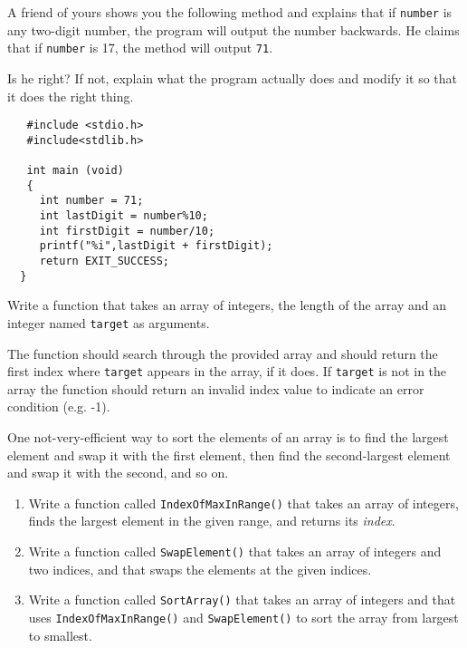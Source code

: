 
\begin{exercise}

A friend of yours shows you the following method and
explains that if {\tt number} is any two-digit number, the program
will output the number backwards.  He claims that if {\tt number} is
17, the method will output {\tt 71}.

Is he right?  If not, explain what the program actually does and
modify it so that it does the right thing.

\begin{verbatim}
   #include <stdio.h>
   #include<stdlib.h>
   
   int main (void)
   {
     int number = 71;
     int lastDigit = number%10;
     int firstDigit = number/10;
     printf("%i",lastDigit + firstDigit);
     return EXIT_SUCCESS;
  }

\end{verbatim}

\end{exercise}


\begin{exercise}
Write a function that takes an array of integers, the length of the array and an integer named
{\tt target} as arguments. 

The function should search through the provided array and should return the first index where
{\tt target} appears in the array, if it does. If {\tt target} is not in the array the function should 
return an invalid index value to indicate an error condition  (e.g.  -1).
\end{exercise}


\begin{exercise}

One not-very-efficient way to sort the elements of an array
is to find the largest element and swap it with the first
element, then find the second-largest element and swap it with
the second, and so on.

\begin{enumerate}

\item Write a function called {\tt IndexOfMaxInRange()} that 
takes an array of integers, finds the
largest element in the given range, and returns its {\em index}.

\item Write a function called {\tt SwapElement()} that takes an
array of integers and two indices, and that swaps the elements
at the given indices.

\item Write a function called {\tt SortArray()} that takes an array of
integers and that uses {\tt IndexOfMaxInRange()} and {\tt SwapElement()}
to sort the array from largest to smallest.

\end{enumerate}
\end{exercise}


